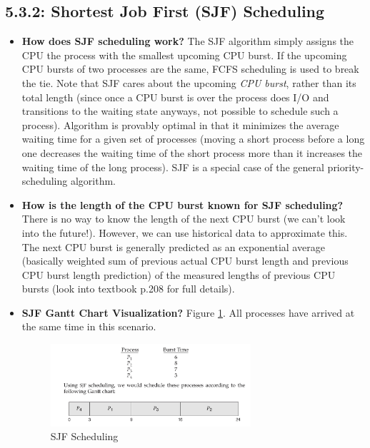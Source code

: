 \documentclass[12pt]{article}
\begin{document}
\subsection*{5.3.2: Shortest Job First (SJF) Scheduling}

\begin{itemize}
    \item \textbf{How does SJF scheduling work?} The SJF algorithm simply assigns the CPU the process with the smallest upcoming CPU burst. If the upcoming CPU bursts of two processes are the same, FCFS scheduling is used to break the tie. Note that SJF cares about the upcoming \textit{CPU burst}, rather than its total length (since once a CPU burst is over the process does I/O and transitions to the waiting state anyways, not possible to schedule such a process). Algorithm is provably optimal in that it minimizes the average waiting time for a given set of processes (moving a short process before a long one decreases the waiting time of the short process more than it increases the waiting time of the long process). SJF is a special case of the general priority-scheduling algorithm.
    \item \textbf{How is the length of the CPU burst known for SJF scheduling?} There is no way to know the length of the next CPU burst (we can't look into the future!). However, we can use historical data to approximate this. The next CPU burst is generally predicted as an exponential average (basically weighted sum of previous actual CPU burst length and previous CPU burst length prediction) of the measured lengths of previous CPU bursts (look into textbook p.208 for full details).
    \item \textbf{SJF Gantt Chart Visualization?} Figure \ref{fig:sjf-scheduling}. All processes have arrived at the same time in this scenario.
        \begin{figure}[ht]
            \centering
            \includegraphics[width=0.7\textwidth]{figures/sjf-scheduling.jpg}
            \caption{SJF Scheduling}
            \label{fig:sjf-scheduling}
        \end{figure}

\end{itemize}
\end{document}
